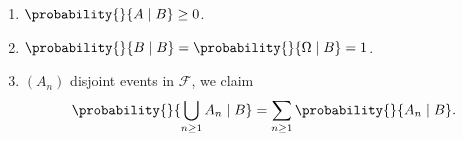 \begin{property}
    \leavevmode
    \begin{enumerate}
        \item \(\probability{}{A\mid B} \geq 0\).
        \item \(\probability{}{B\mid B}  = \probability{}{\Omega\mid B} = 1\).
        \item \((A_n)\) disjoint events in \(\mathcal{F}\), we claim
        \[
            \probability{}{\bigcup_{n\geq 1}A_n \mid B} = \sum\limits_{n\geq 1}\probability{}{A_n \mid B}.
        \]
    \end{enumerate}
\end{property}